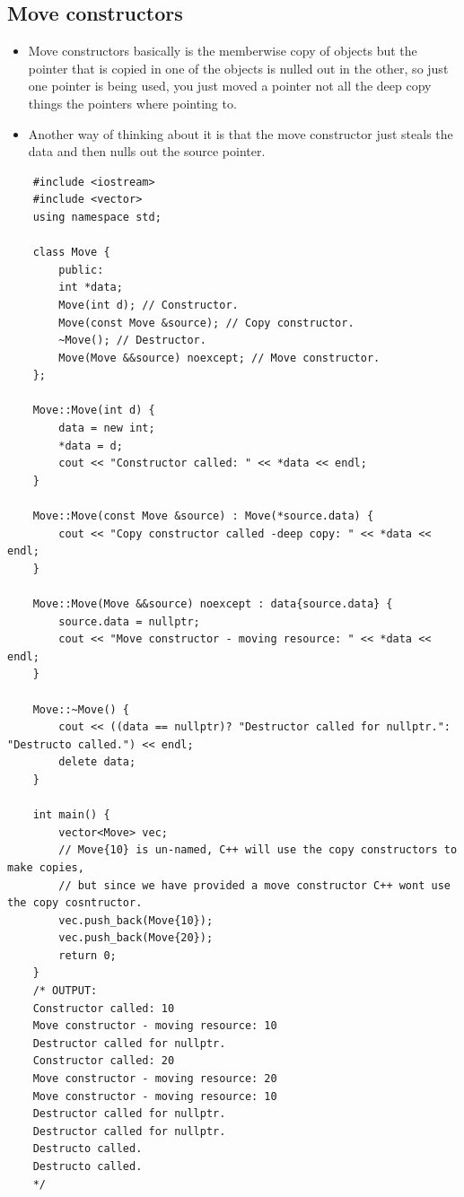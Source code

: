 \subsection{Move constructors}
\begin{itemize}
    \item Move constructors basically is the memberwise copy of objects but the pointer that is copied in one of the objects is nulled out in the other, so just one pointer is being used, you just moved a pointer not all the deep copy things the pointers where pointing to.
    \item Another way of thinking about it is that the move constructor just steals the data and then nulls out the source pointer.
\end{itemize}
\begin{verbatim}
    #include <iostream>
    #include <vector>
    using namespace std;

    class Move {
        public: 
        int *data;
        Move(int d); // Constructor.
        Move(const Move &source); // Copy constructor.
        ~Move(); // Destructor.
        Move(Move &&source) noexcept; // Move constructor.
    };

    Move::Move(int d) {
        data = new int;
        *data = d;
        cout << "Constructor called: " << *data << endl;
    }

    Move::Move(const Move &source) : Move(*source.data) {
        cout << "Copy constructor called -deep copy: " << *data << endl;
    }

    Move::Move(Move &&source) noexcept : data{source.data} {
        source.data = nullptr;
        cout << "Move constructor - moving resource: " << *data << endl;
    }

    Move::~Move() {
        cout << ((data == nullptr)? "Destructor called for nullptr.": "Destructo called.") << endl;
        delete data;
    }

    int main() {
        vector<Move> vec;
        // Move{10} is un-named, C++ will use the copy constructors to make copies, 
        // but since we have provided a move constructor C++ wont use the copy cosntructor.
        vec.push_back(Move{10}); 
        vec.push_back(Move{20}); 
        return 0;
    }
    /* OUTPUT:
    Constructor called: 10
    Move constructor - moving resource: 10
    Destructor called for nullptr.
    Constructor called: 20
    Move constructor - moving resource: 20
    Move constructor - moving resource: 10
    Destructor called for nullptr.
    Destructor called for nullptr.
    Destructo called.
    Destructo called.
    */
\end{verbatim}


